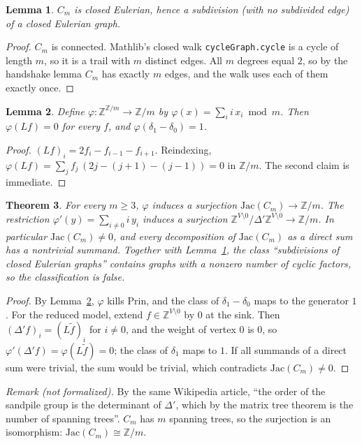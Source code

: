 \documentclass[11pt]{article}
\newtheorem{theorem}{Theorem}
\newtheorem{lemma}[theorem]{Lemma}
\theoremstyle{definition}
\begin{document}
\begin{lemma}\label{lem:euler}
$C_m$ is closed Eulerian, hence a subdivision (with no subdivided edge) of a closed Eulerian graph.
\end{lemma}
\begin{proof}
$C_m$ is connected. Mathlib's closed walk \texttt{cycleGraph.cycle} is a cycle of length $m$, so it
is a trail with $m$ distinct edges. All $m$ degrees equal $2$, so by the handshake lemma $C_m$ has
exactly $m$ edges, and the walk uses each of them exactly once.
\end{proof}

\begin{lemma}\label{lem:phi}
Define $\varphi:\mathbb Z^{\mathbb Z/m}\to\mathbb Z/m$ by $\varphi(x)=\sum_i i\,x_i \bmod m$. Then
$\varphi(Lf)=0$ for every $f$, and $\varphi(\delta_1-\delta_0)=1$.
\end{lemma}
\begin{proof}
$(Lf)_i=2f_i-f_{i-1}-f_{i+1}$. Reindexing, $\varphi(Lf)=\sum_j f_j\,(2j-(j+1)-(j-1))=0$ in
$\mathbb Z/m$. The second claim is immediate.
\end{proof}

\begin{theorem}\label{thm:main}
For every $m\ge3$, $\varphi$ induces a surjection $\mathrm{Jac}(C_m)\to\mathbb Z/m$. The
restriction $\varphi'(y)=\sum_{i\ne0} i\,y_i$ induces a surjection
$\mathbb Z^{V\setminus 0}/\Delta'\mathbb Z^{V\setminus 0}\to\mathbb Z/m$. In particular
$\mathrm{Jac}(C_m)\neq0$, and every decomposition of $\mathrm{Jac}(C_m)$ as a direct sum has a
nontrivial summand. Together with Lemma~\ref{lem:euler}, the class ``subdivisions of closed
Eulerian graphs'' contains graphs with a nonzero number of cyclic factors, so the classification is
false.
\end{theorem}
\begin{proof}
By Lemma~\ref{lem:phi}, $\varphi$ kills $\mathrm{Prin}$, and the class of $\delta_1-\delta_0$ maps to
the generator $1$. For the reduced model, extend $f\in\mathbb Z^{V\setminus0}$ by $0$ at the sink.
Then $(\Delta'f)_i=(L\tilde f)_i$ for $i\neq0$, and the weight of vertex $0$ is $0$, so
$\varphi'(\Delta'f)=\varphi(L\tilde f)=0$; the class of $\delta_1$ maps to $1$. If all summands of
a direct sum were trivial, the sum would be trivial, which contradicts $\mathrm{Jac}(C_m)\ne0$.
\end{proof}
\noindent\emph{Remark (not formalized).} By the same Wikipedia article, ``the order of the sandpile
group is the determinant of $\Delta'$, which by the matrix tree theorem is the number of spanning
trees''. $C_m$ has $m$ spanning trees, so the surjection is an isomorphism:
$\mathrm{Jac}(C_m)\cong\mathbb Z/m$.
\end{document}
